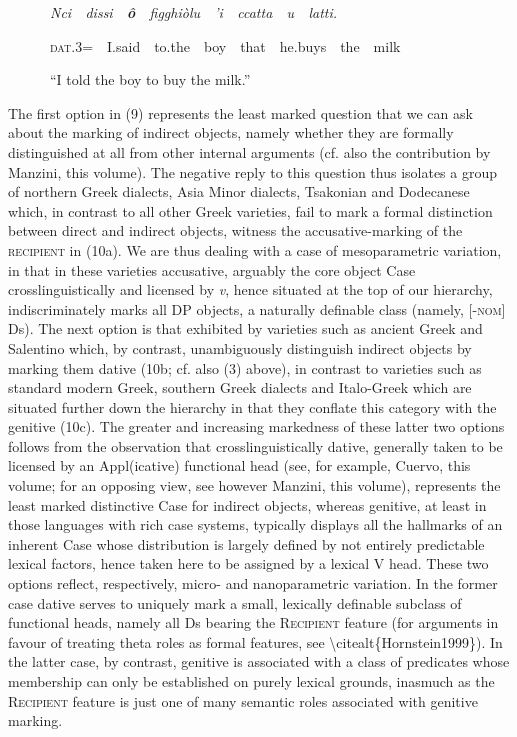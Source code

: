 \documentclass[output=paper,modfonts,nonflat]{langsci/langscibook}
\begin{document}
\begin{styleStandard}
\ \ \ \ \ \ \textit{Nci\ \ dissi\ \ }\textbf{\textit{ô}}\textit{\ \ figghiòlu\ \ ’i\ \ ccatta\ \ u\ \ latti.}
\end{styleStandard}

\begin{styleStandard}
\ \ \ \ \ \ \textsc{dat}.3=\ \ I.said\ \ to.the\ \ boy\ \ that\ \ he.buys\ \ the\ \ milk
\end{styleStandard}

\begin{styleesempi}
\ \ \ \ \ \ “I told the boy to buy the milk.”
\end{styleesempi}

\begin{styleStandard}
The first option in (9) represents the least marked question that we can ask about the marking of indirect objects, namely whether they are formally distinguished at all from other internal arguments (cf. also the contribution by Manzini, this volume). The negative reply to this question thus isolates a group of northern Greek dialects, Asia Minor dialects, Tsakonian and Dodecanese which, in contrast to all other Greek varieties, fail to mark a formal distinction between direct and indirect objects, witness the accusative-marking of the \textsc{recipient} in (10a). We are thus dealing with a case of mesoparametric variation, in that in these varieties accusative, arguably the core object Case crosslinguistically and licensed by \textit{v}, hence situated at the top of our hierarchy, indiscriminately marks all DP objects, a naturally definable class (namely, [-\textsc{nom}] Ds). The next option is that exhibited by varieties such as ancient Greek and Salentino\textit{ }which, by contrast, unambiguously distinguish indirect objects by marking them dative (10b; cf. also (3) above), in contrast to varieties such as standard modern Greek, southern Greek dialects and Italo-Greek which are situated further down the hierarchy in that they conflate this category with the genitive (10c). The greater and increasing markedness of these latter two options follows from the observation that crosslinguistically dative, generally taken to be licensed by an Appl(icative) functional head (see, for example, Cuervo, this volume; for an opposing view, see however Manzini, this volume), represents the least marked distinctive Case for indirect objects, whereas genitive, at least in those languages with rich case systems, typically displays all the hallmarks of an inherent Case whose distribution is largely defined by not entirely predictable lexical factors, hence taken here to be assigned by a lexical V head. These two options reflect, respectively, micro- and nanoparametric variation. In the former case dative serves to uniquely mark a small, lexically definable subclass of functional heads, namely all Ds bearing the \textsc{Recipient} feature (for arguments in favour of treating theta roles as formal features, see {\textbackslash}citealt\{Hornstein1999\}). In the latter case, by contrast, genitive is associated with a class of predicates whose membership can only be established on purely lexical grounds, inasmuch as the \textsc{Recipient} feature is just one of many semantic roles associated with genitive marking. 

\end{styleStandard}
\end{document}
